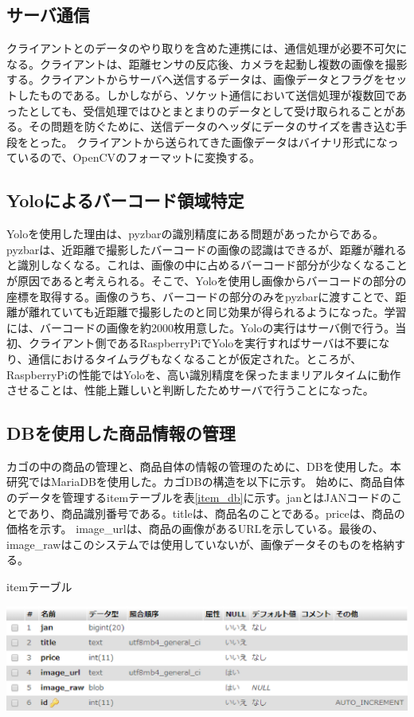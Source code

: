 \newpage

\subsection*{サーバ通信}
クライアントとのデータのやり取りを含めた連携には、通信処理が必要不可欠になる。クライアントは、距離センサの反応後、カメラを起動し複数の画像を撮影する。クライアントからサーバへ送信するデータは、画像データとフラグをセットしたものである。しかしながら、ソケット通信において送信処理が複数回であったとしても、受信処理ではひとまとまりのデータとして受け取られることがある。その問題を防ぐために、送信データのヘッダにデータのサイズを書き込む手段をとった。
クライアントから送られてきた画像データはバイナリ形式になっているので、OpenCV\cite{opencv}のフォーマットに変換する。

\subsection*{Yoloによるバーコード領域特定}
Yoloを使用した理由は、pyzbar\cite{pyzbar}の識別精度にある問題があったからである。pyzbar\cite{pyzbar}は、近距離で撮影したバーコードの画像の認識はできるが、距離が離れると識別しなくなる。これは、画像の中に占めるバーコード部分が少なくなることが原因であると考えられる。そこで、Yoloを使用し画像からバーコードの部分の座標を取得する。画像のうち、バーコードの部分のみをpyzbarに渡すことで、距離が離れていても近距離で撮影したのと同じ効果が得られるようになった。学習には、バーコードの画像を約2000枚用意した。Yoloの実行はサーバ側で行う。当初、クライアント側であるRaspberryPiでYoloを実行すればサーバは不要になり、通信におけるタイムラグもなくなることが仮定された。ところが、RaspberryPiの性能ではYoloを、高い識別精度を保ったままリアルタイムに動作させることは、性能上難しいと判断したためサーバで行うことになった。

\newpage

\subsection*{DBを使用した商品情報の管理}
カゴの中の商品の管理と、商品自体の情報の管理のために、DBを使用した。本研究ではMariaDBを使用した。カゴDBの構造を以下に示す。
始めに、商品自体のデータを管理するitemテーブルを表\ref{item_db}に示す。janとはJANコードのことであり、商品識別番号である。titleは、商品名のことである。priceは、商品の価格を示す。
image\_urlは、商品の画像があるURLを示している。最後の、image\_rawはこのシステムでは使用していないが、画像データそのものを格納する。
\begin{table}[htbp]
\centering
\caption{itemテーブル}
\includegraphics[width=15cm]{./pic/item_db.eps}
\label{item_db}
\end{table}

